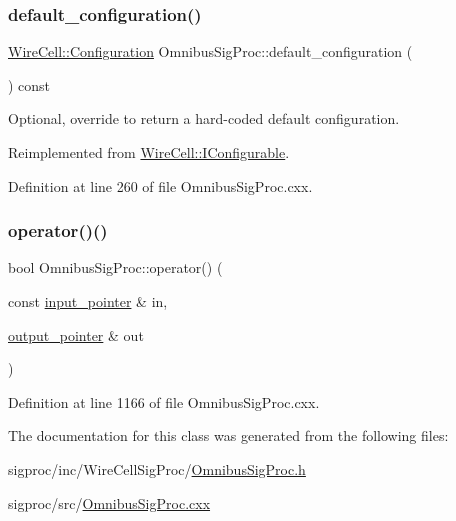 \subsubsection{\texorpdfstring{default\+\_\+configuration()}{default\_configuration()}}
{\footnotesize\ttfamily \hyperlink{namespace_wire_cell_a9f705541fc1d46c608b3d32c182333ee}{Wire\+Cell\+::\+Configuration} Omnibus\+Sig\+Proc\+::default\+\_\+configuration (\begin{DoxyParamCaption}{ }\end{DoxyParamCaption}) const\hspace{0.3cm}{\ttfamily [virtual]}}



Optional, override to return a hard-\/coded default configuration. 



Reimplemented from \hyperlink{class_wire_cell_1_1_i_configurable_a54841b2da3d1ea02189478bff96f7998}{Wire\+Cell\+::\+I\+Configurable}.



Definition at line 260 of file Omnibus\+Sig\+Proc.\+cxx.

\mbox{\label{class_wire_cell_1_1_sig_proc_1_1_omnibus_sig_proc_a1bda3aebba83392f79b35d4714cc8b43}} 
\subsubsection{\texorpdfstring{operator()()}{operator()()}}
{\footnotesize\ttfamily bool Omnibus\+Sig\+Proc\+::operator() (\begin{DoxyParamCaption}\item[{const \hyperlink{class_wire_cell_1_1_i_function_node_a55c0946156df9b712b8ad1a0b59b2db6}{input\+\_\+pointer} \&}]{in,  }\item[{\hyperlink{class_wire_cell_1_1_i_function_node_afc02f1ec60d31aacddf64963f9ca650b}{output\+\_\+pointer} \&}]{out }\end{DoxyParamCaption})\hspace{0.3cm}{\ttfamily [virtual]}}



Definition at line 1166 of file Omnibus\+Sig\+Proc.\+cxx.



The documentation for this class was generated from the following files\+:\begin{DoxyCompactItemize}
\item 
sigproc/inc/\+Wire\+Cell\+Sig\+Proc/\hyperlink{_omnibus_sig_proc_8h}{Omnibus\+Sig\+Proc.\+h}\item 
sigproc/src/\hyperlink{_omnibus_sig_proc_8cxx}{Omnibus\+Sig\+Proc.\+cxx}\end{DoxyCompactItemize}
